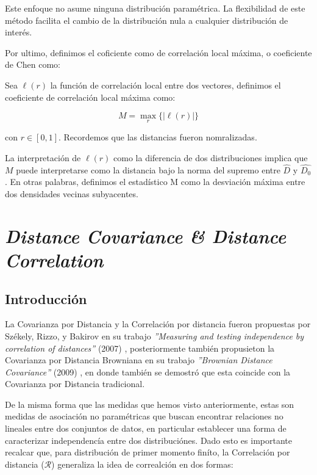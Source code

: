 	Este enfoque no asume ninguna distribuci\'on param\'etrica. La flexibilidad de este m\'etodo facilita el cambio de la distribuci\'on nula a cualquier distribuci\'on de inter\'es. 
	
	Por ultimo, definimos el coficiente como de correlaci\'on local m\'axima, o coeficiente de Chen como:

	\begin{defn}
		Sea $\ell(r)$ la funci\'on de correlaci\'on local entre dos vectores, definimos el coeficiente de correlaci\'on local m\'axima como:

		$$
		M=\max _{r}\{|\ell(r)|\}
		$$

		con $r\in[0,1]$. Recordemos que las distancias fueron nomralizadas.
		
	\end{defn}
	La interpretaci\'on de $\ell(r)$ como la diferencia de dos distribuciones implica que $M$ puede interpretarse como la distancia bajo la norma del supremo entre $\widehat{D}$ y $\widehat{D_0}$. En otras palabras, definimos el estad\'istico M como la desviaci\'on m\'axima entre dos densidades vecinas subyacentes.

\section[]{\textit{Distance Covariance \& Distance Correlation}} 

\subsection{Introducci\'on}


La Covarianza por Distancia  y la Correlaci\'on por distancia  fueron propuestas por Sz\'ekely, Rizzo, y Bakirov en su trabajo \textit{''Measuring and testing independence by correlation of distances''} (2007) \cite{Szekely2007}, posteriormente tambi\'en propusieton la Covarianza por Distancia Browniana en su trabajo \textit{''Brownian Distance Covariance''} (2009) \cite{Szekely2009}, en donde tambi\'en se demostr\'o que esta coincide con la Covarianza por Distancia tradicional.

De la misma forma que las medidas que hemos visto anteriormente, estas son medidas de asociaci\'on no param\'etricas que buscan encontrar relaciones no lineales entre dos conjuntos de datos, en particular establecer una forma de caracterizar independenc\'ia entre dos distribuci\'ones. Dado esto es importante recalcar que, para distribuci\'on de primer momento fin\'ito, la Correlaci\'on por distancia ($\mathcal{R}$) generaliza la idea de correalci\'on en dos formas:

